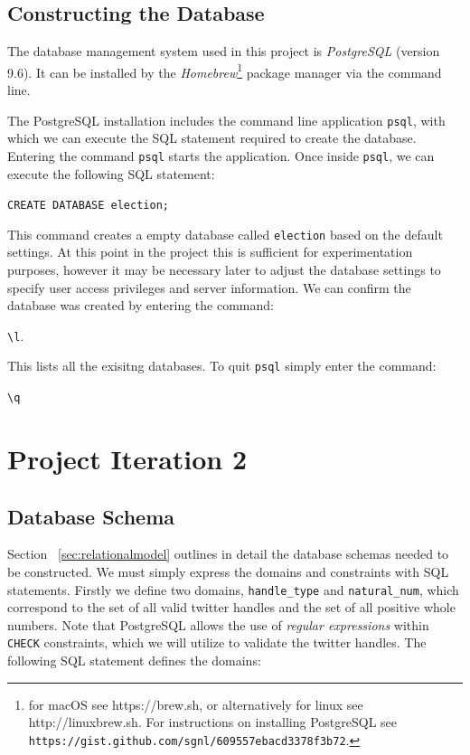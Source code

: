 \documentclass[a4paper, 12pt]{report}
\begin{document}
\newpage
\section{Constructing the Database}
\label{sec:constructingTheDatabase}

The database management system used in this project is \textit{PostgreSQL} (version 9.6). It can be installed by the \textit{Homebrew}\footnote{for macOS see https://brew.sh, or alternatively for linux see http://linuxbrew.sh. For instructions on installing PostgreSQL see \texttt{https://gist.github.com/sgnl/609557ebacd3378f3b72}.} package manager via the command line.

The PostgreSQL installation includes the command line application \texttt{psql}, with which we can execute the SQL statement required to create the database. Entering the command \texttt{psql} starts the application. Once inside \texttt{psql}, we can execute the following SQL statement:

\texttt{CREATE DATABASE election; }

This command creates a empty database called \texttt{election} based on the default settings. At this point in the project this is sufficient for experimentation purposes, however it may be necessary later to adjust the database settings to specify user access privileges and server information. We can confirm the database was created by entering the command:

\texttt{\textbackslash l}.

This lists all the exisitng databases. To quit \texttt{psql} simply enter the command:

\texttt{\textbackslash q}



\chapter{Project Iteration 2}
\label{ch:iteration2}

\newpage
\section{Database Schema}
Section ~\ref{sec:relationalmodel} outlines in detail the database schemas needed to be constructed. We must simply express the domains and constraints with SQL statements. Firstly we define two domains, \texttt{handle\_type} and \texttt{natural\_num}, which correspond to the set of all valid twitter handles and the set of all positive whole numbers. Note that PostgreSQL allows the use of \textit{regular expressions} within \texttt{CHECK} constraints, which we will utilize to validate the twitter handles. The following SQL statement defines the domains:
\end{document}
